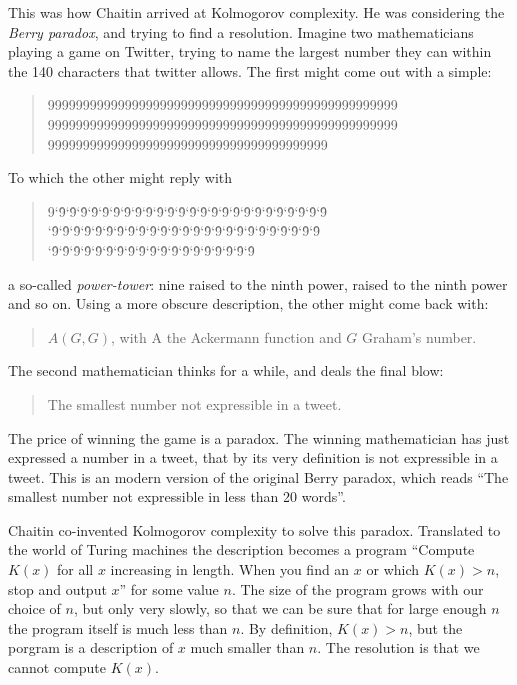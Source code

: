 This was how Chaitin arrived at Kolmogorov complexity. He was considering the \emph{Berry paradox}, and trying to find a resolution. Imagine two mathematicians playing a game on Twitter, trying to name the largest number they can within the 140 characters that twitter allows. The first might come out with a simple:
\begin{quote}
99999999999999999999999999999999999999999999999999 99999999999999999999999999999999999999999999999999 9999999999999999999999999999999999999999
\end{quote}
To which the other might reply with
\begin{quote}
9\char`\^9\char`\^9\char`\^9\char`\^9\char`\^9\char`\^9\char`\^9\char`\^9\char`\^9\char`\^9\char`\^9\char`\^9\char`\^9\char`\^9\char`\^9\char`\^9\char`\^9\char`\^9\char`\^9\char`\^9\char`\^9\char`\^9\char`\^9\char`\^9\char`\^9 
\char`\^9\char`\^9\char`\^9\char`\^9\char`\^9\char`\^9\char`\^9\char`\^9\char`\^9\char`\^9\char`\^9\char`\^9\char`\^9\char`\^9\char`\^9\char`\^9\char`\^9\char`\^9\char`\^9\char`\^9\char`\^9\char`\^9\char`\^9\char`\^9\char`\^9 
\char`\^9\char`\^9\char`\^9\char`\^9\char`\^9\char`\^9\char`\^9\char`\^9\char`\^9\char`\^9\char`\^9\char`\^9\char`\^9\char`\^9\char`\^9\char`\^9\char`\^9\char`\^9\char`\^9
\end{quote}
a so-called \emph{power-tower}: nine raised to the ninth power, raised to the ninth power and so on. Using a more obscure description, the other might come back with:
\begin{quote}
$A(G, G)$, with A the Ackermann function and $G$ Graham's number.
\end{quote}
The second mathematician thinks for a while, and deals the final blow:
\begin{quote}
The smallest number not expressible in a tweet.
\end{quote}
The price of winning the game is a paradox. The winning mathematician has just expressed a number in a tweet, that by its very definition is not expressible in a tweet. This is an modern version of the original Berry paradox, which reads ``The smallest number not expressible in less than 20 words''.


Chaitin co-invented Kolmogorov complexity to solve this paradox. Translated to the world of Turing machines the description becomes a program ``Compute $K(x)$ for all $x$ increasing in length. When you find an $x$ or which $K(x) > n$, stop and output $x$'' for some value $n$. The size of the program grows with our choice of $n$, but only very slowly, so that we can be sure that for large enough $n$ the program itself is much less than $n$. By definition, $K(x) > n$, but the porgram is a description of $x$ much smaller than $n$. The resolution is that we cannot compute $K(x)$. 

